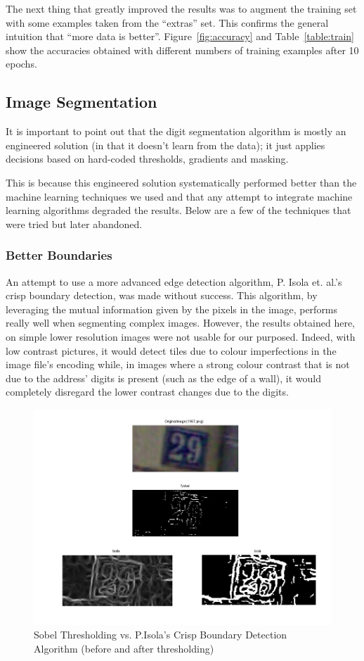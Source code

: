 \documentclass{article} %
\begin{document}
The next thing that greatly improved the results was to augment the training set with some examples taken from the “extras” set. This confirms the general intuition that “more data is better”.  Figure~\ref{fig:accuracy} and Table~\ref{table:train} show the accuracies obtained with different numbers of training examples after 10 epochs.

\subsection{Image Segmentation}

It is important to point out that the digit segmentation algorithm is mostly an engineered solution (in that it doesn’t learn from the data); it just applies decisions based on hard-coded thresholds, gradients and masking.

This is because this engineered solution systematically performed better than the machine learning techniques we used and that any attempt to integrate machine learning algorithms degraded the results. Below are a few of the techniques that were tried but later abandoned.

\subsubsection{Better Boundaries}
An attempt to use a more advanced edge detection algorithm, P. Isola et. al.’s crisp boundary detection\cite{isola2014crisp}, was made without success. This algorithm, by leveraging the mutual information given by the pixels in the image, performs really well when segmenting complex images. However, the results obtained here, on simple lower resolution images were not usable for our purposed. Indeed, with low contrast pictures, it would detect tiles due to colour imperfections in the image file’s encoding while, in images where a strong colour contrast that is not due to the address’ digits is present (such as the edge of a wall), it would completely disregard the lower contrast changes due to the digits.

\begin{center}
\begin{figure}[!htb]
  \includegraphics[width=0.8\linewidth]{image09}
  \caption{Sobel Thresholding vs. P.Isola's Crisp Boundary Detection Algorithm (before and after thresholding)}
  \label{fig:isola}
\end{figure}
\end{center}
\end{document}
